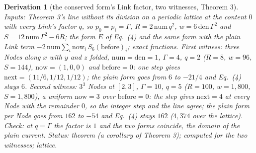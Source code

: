 \documentclass[pdflatex,sn-mathphys-num]{sn-jnl}
\newcommand{\num}{\mathrm{num}}
\newcommand{\den}{\mathrm{den}}
\theoremstyle{thmstyleone}
\newtheorem{derivation}{Derivation}
\begin{document}
\begin{derivation}[the conserved form's Link factor, two witnesses, Theorem 3]
\emph{Inputs:} Theorem 3's line without its division on a periodic lattice at the content $0$ with every Link's factor $q$, so $p_0 = p_i = \Gamma$, $R = 2\,\num\,q^2$, $w = 6\,\den\,\Gamma^2$ and $S = 12\,\num\,\Gamma^2 - 6R$; the form $E$ of Eq.~(4) and the same form with the plain Link term $-2\,\num\sum_i \mathrm{now}_i\,S_6(\mathrm{before})_i$; exact fractions. \emph{First witness:} three Nodes along $x$ with $y$ and $z$ folded, $\num = \den = 1$, $\Gamma = 4$, $q = 2$ ($R = 8$, $w = 96$, $S = 144$), $\mathrm{now} = (1, 0, 0)$ and $\mathrm{before} = 0$: one step gives $\mathrm{next} = (11 / 6, 1 / 12, 1 / 12)$; the plain form goes from $6$ to $-21 / 4$ and Eq.~(4) stays $6$. \emph{Second witness:} $3^3$ Nodes at $[2, 3]$, $\Gamma = 10$, $q = 5$ ($R = 100$, $w = 1{,}800$, $S = 1{,}800$), a uniform $\mathrm{now} = 3$ over $\mathrm{before} = 0$: the step gives $\mathrm{next} = 4$ at every Node with the remainder $0$, so the integer step and the line agree; the plain form per Node goes from $162$ to $-54$ and Eq.~(4) stays $162$ ($4{,}374$ over the lattice). \emph{Check:} at $q = \Gamma$ the factor is $1$ and the two forms coincide, the domain of the plain current.
 \emph{Status:} theorem (a corollary of Theorem 3); computed for the two witnesses; lattice.
\end{derivation}
\end{document}
